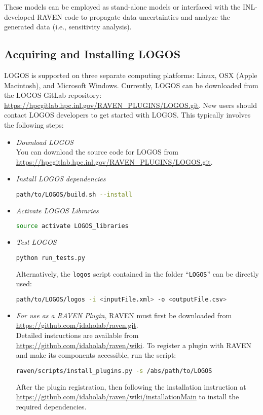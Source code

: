 These models can be employed as stand-alone models or interfaced with the INL-developed RAVEN code
to propagate data uncertainties and analyze the generated data (i.e., sensitivity analysis).

\subsection{Acquiring and Installing LOGOS}
LOGOS is supported on three separate computing platforms: Linux, OSX (Apple Macintosh), and Microsoft
Windows.
 Currently, LOGOS can be downloaded from the LOGOS GitLab repository:
\url{https://hpcgitlab.hpc.inl.gov/RAVEN_PLUGINS/LOGOS.git}.
New users should contact LOGOS developers to get started with LOGOS.
This typically involves the following steps:

\begin{itemize}
  \item \textit{Download LOGOS}
    \\ You can download the source code for LOGOS from \url{https://hpcgitlab.hpc.inl.gov/RAVEN_PLUGINS/LOGOS.git}.
  \item \textit{Install LOGOS dependencies}
	\begin{lstlisting}[language=bash]
	path/to/LOGOS/build.sh --install
	\end{lstlisting}
  \item \textit{Activate LOGOS Libraries}
  \begin{lstlisting}[language=bash]
  source activate LOGOS_libraries
  \end{lstlisting}
  \item \textit{Test LOGOS}
	\begin{lstlisting}[language=bash]
	python run_tests.py
	\end{lstlisting}
  	Alternatively, the \texttt{logos} script
    contained in the folder ``\texttt{LOGOS}'' can be directly used:
\begin{lstlisting}[language=bash]
path/to/LOGOS/logos -i <inputFile.xml> -o <outputFile.csv>
\end{lstlisting}
	\item \textit{For use as a RAVEN Plugin}, RAVEN must first be downloaded from
  \url{https://github.com/idaholab/raven.git}.
		\\ Detailed instructions are available from \url{https://github.com/idaholab/raven/wiki}.
    To register a plugin with RAVEN and make its components accessible, run the script:
    \begin{lstlisting}[language=bash]
raven/scripts/install_plugins.py -s /abs/path/to/LOGOS
  	\end{lstlisting}
    After the plugin registration, then following the installation instruction at
    \url{https://github.com/idaholab/raven/wiki/installationMain} to install the
    required dependencies.
\end{itemize}

